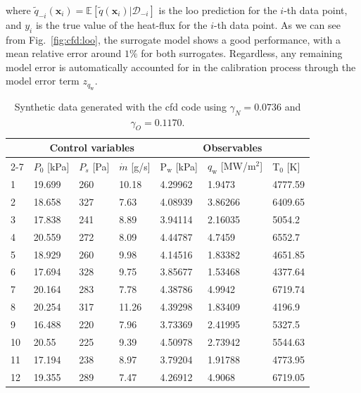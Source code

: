where $\tilde{q}_{-i}(\mathbf{x}_i) = \mathbb{E}[\tilde{q}(\mathbf{x}_i) | \mathcal{D}_{-i}]$ is the \gls{loo} prediction for the $i$-th data point, and $y_i$ is the true value of the heat-flux for the $i$-th data point. As we can see from Fig.~\ref{fig:cfd:loo}, the surrogate model shows a good performance, with a mean relative error around $1\%$ for both surrogates. Regardless, any remaining model error is automatically accounted for in the calibration process through the model error term $z_{q_\mathrm{w}}$. 

\begin{table}[htbp] 
  \small
  \centering
  \begin{tabular}{|p{0.5cm}|p{1.5cm}|p{1.5cm}|p{1.5cm}|p{1.5cm}|p{2.2cm}| p{2.2cm}|} 
    \hline
    & \multicolumn{3}{|c|}{\textbf{Control variables}} &\multicolumn{3}{|c|}{\textbf{Observables}} \\ \cline{2-7} 
    & $P_0$ [kPa] & $P_s$ [Pa] & $\dot{m}$ [g/s] & $\mathrm{P}_{\mathrm{w}}$ [kPa] & $q_{\mathrm{w}}$ [MW/m$^2$] & T$_0$ [K] \\ \hline
      1 & 19.699 & 260 & 10.18 & 4.29962 & 1.9473 & 4777.59\\
      2 & 18.658 & 327 & 7.63 & 4.08939 & 3.86266 & 6409.65\\
      3 & 17.838 & 241 & 8.89 & 3.94114 & 2.16035 & 5054.2\\
      4 & 20.559 & 272 & 8.09 & 4.44787 & 4.7459 & 6552.7\\
      5 & 18.929 & 260 & 9.98 & 4.14516 & 1.83382 & 4651.85\\
      6 & 17.694 & 328 & 9.75 & 3.85677 & 1.53468 & 4377.64\\
      7 & 20.164 & 283 & 7.78 & 4.38786 & 4.9942 & 6719.74\\
      8 & 20.254 & 317 & 11.26 & 4.39298 & 1.83409 & 4196.9\\
      9 & 16.488 & 220 & 7.96 & 3.73369 & 2.41995 & 5327.5\\
      10 & 20.55 & 225 & 9.39 & 4.50978 & 2.73942 & 5544.63\\
      11 & 17.194 & 238 & 8.97 & 3.79204 & 1.91788 & 4773.95\\
      12 & 19.355 & 289 & 7.47 & 4.26912 & 4.9068 & 6719.05\\
    \hline
  \end{tabular}
  \caption{Synthetic data generated with the \gls{cfd} code using $\gamma_N = 0.0736$ and $\gamma_O = 0.1170$. }
  \label{tab:exp_data}
\end{table}

